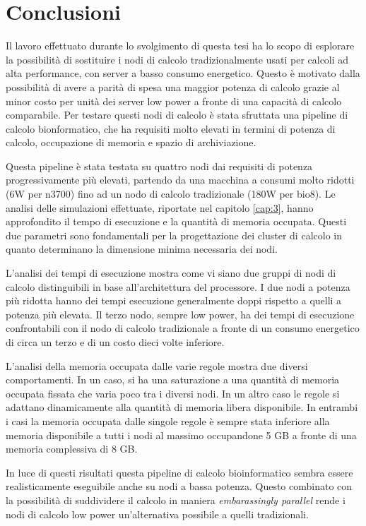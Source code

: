 \chapter{Conclusioni}
Il lavoro effettuato durante lo svolgimento di questa tesi ha lo scopo di esplorare la possibilità di sostituire i nodi di calcolo tradizionalmente usati per calcoli ad alta performance, con server a basso consumo energetico.
Questo è motivato dalla possibilità di avere a parità di spesa una maggior potenza di calcolo grazie al minor costo per unità dei server low power a fronte di una capacità di calcolo comparabile.
Per testare questi nodi di calcolo è stata sfruttata una pipeline di calcolo bionformatico, che ha requisiti molto elevati in termini di potenza di calcolo, occupazione di memoria e spazio di archiviazione.

Questa pipeline è stata testata su quattro nodi dai requisiti di potenza progressivamente più elevati, partendo da una macchina a consumi molto ridotti (6W per n3700) fino ad un nodo di calcolo tradizionale (180W per bio8).
Le analisi delle simulazioni effettuate, riportate nel capitolo \ref{cap:3}, hanno approfondito il tempo di esecuzione e la quantità di memoria occupata.
Questi due parametri sono fondamentali per la progettazione dei cluster di calcolo in quanto determinano la dimensione minima necessaria dei nodi.

L'analisi dei tempi di esecuzione mostra come vi siano due gruppi di nodi di calcolo distinguibili in base all'architettura del processore.
I due nodi a potenza più ridotta hanno dei tempi esecuzione generalmente doppi rispetto a quelli a potenza più elevata.
Il terzo nodo, sempre low power, ha dei tempi di esecuzione confrontabili con il nodo di calcolo tradizionale a fronte di un consumo energetico di circa un terzo e di un costo dieci volte inferiore.

L'analisi della memoria occupata dalle varie regole mostra due diversi comportamenti.
In un caso, si ha una saturazione a una quantità di memoria occupata fissata che varia poco tra i diversi nodi.
In un altro caso le regole si adattano dinamicamente alla quantità di memoria libera disponibile.
In entrambi i casi la memoria occupata dalle singole regole è sempre stata inferiore alla memoria disponibile a tutti i nodi al massimo occupandone 5 GB a fronte di una memoria complessiva di 8 GB.

In luce di questi risultati questa pipeline di calcolo bioinformatico sembra essere realisticamente eseguibile anche su nodi a bassa potenza.
Questo combinato con la possibilità di suddividere il calcolo in maniera \textit{embarassingly parallel} rende i nodi di calcolo low power un'alternativa possibile a quelli tradizionali. 


